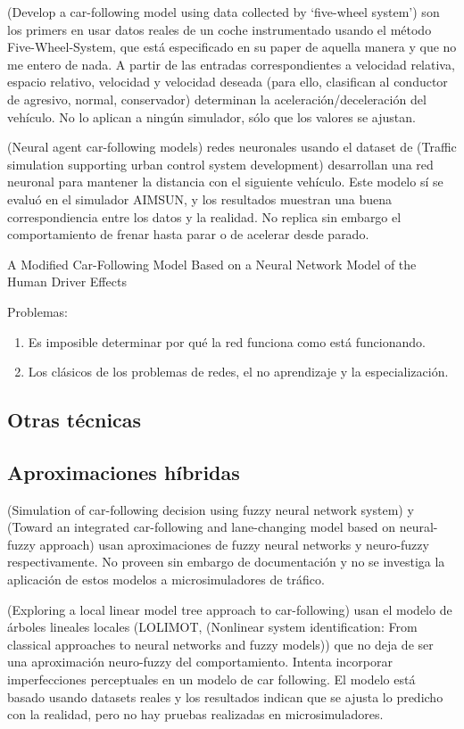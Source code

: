 (Develop a car-following model using data collected by ‘five-wheel
system’) son los primers en usar datos reales de un coche instrumentado usando el método Five-Wheel-System, que está especificado en su paper de aquella manera y que no me entero de nada. A partir de las entradas correspondientes a velocidad relativa, espacio relativo, velocidad y velocidad deseada (para ello, clasifican al conductor de agresivo, normal, conservador) determinan la aceleración/deceleración del vehículo. No lo aplican a ningún simulador, sólo que los valores se ajustan.

(Neural agent car-following models) redes neuronales usando el dataset de (Traffic simulation supporting urban control system development) desarrollan una red neuronal para mantener la distancia con el siguiente vehículo. Este modelo sí se evaluó en el simulador AIMSUN, y los resultados muestran una buena correspondiencia entre los datos y la realidad. No replica sin embargo el comportamiento de frenar hasta parar o de acelerar desde parado.

A Modified Car-Following Model Based on a Neural Network Model of the Human Driver Effects


Problemas:

\begin{enumerate}
	\item Es imposible determinar por qué la red funciona como está funcionando.
	\item Los clásicos de los problemas de redes, el no aprendizaje y la especialización.
\end{enumerate}

\subsection{Otras técnicas}

\subsection{Aproximaciones híbridas}

(Simulation of car-following decision using fuzzy neural network system) y (Toward an integrated car-following and lane-changing model based on neural-fuzzy approach) usan aproximaciones de fuzzy neural networks y neuro-fuzzy respectivamente. No proveen sin embargo de documentación y no se investiga la aplicación de estos modelos a microsimuladores de tráfico.

(Exploring a local linear model tree approach to car-following) usan el modelo de árboles lineales locales (LOLIMOT, (Nonlinear system identification: From classical approaches to neural networks and fuzzy models)) que no deja de ser una aproximación neuro-fuzzy del comportamiento. Intenta incorporar imperfecciones perceptuales en un modelo de car following. El modelo está basado usando datasets reales y los resultados indican que se ajusta lo predicho con la realidad, pero no hay pruebas realizadas en microsimuladores.

